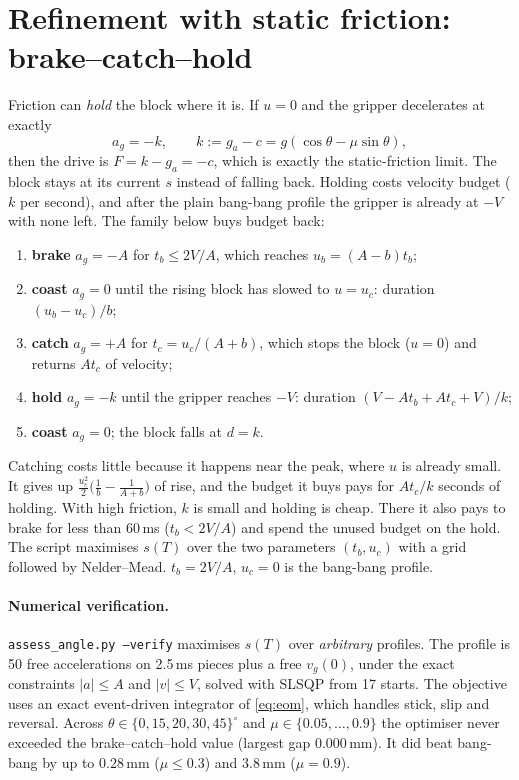 \documentclass[11pt,a4paper]{article}
\newcommand{\code}[1]{\texttt{#1}}
\begin{document}
\section{Refinement with static friction: brake--catch--hold}\label{sec:hold}
Friction can \emph{hold} the block where it is. If $u=0$ and the gripper decelerates at exactly
\[
  a_g=-k,\qquad k:=g_a-c=g(\cos\theta-\mu\sin\theta),
\]
then the drive is $F=k-g_a=-c$, which is exactly the static-friction limit. The block stays at its current $s$ instead of
falling back. Holding costs velocity budget ($k$ per second), and after the plain bang-bang profile the gripper is
already at $-V$ with none left. The family below buys budget back:
\begin{enumerate}
  \item \textbf{brake} $a_g=-A$ for $t_b\le 2V/A$, which reaches $u_b=(A-b)t_b$;
  \item \textbf{coast} $a_g=0$ until the rising block has slowed to $u=u_c$: duration $(u_b-u_c)/b$;
  \item \textbf{catch} $a_g=+A$ for $t_c=u_c/(A+b)$, which stops the block ($u=0$) and returns $At_c$ of velocity;
  \item \textbf{hold} $a_g=-k$ until the gripper reaches $-V$: duration $(V-At_b+At_c+V)/k$;
  \item \textbf{coast} $a_g=0$; the block falls at $d=k$.
\end{enumerate}
Catching costs little because it happens near the peak, where $u$ is already small. It gives up
$\tfrac{u_c^2}{2}\big(\tfrac1b-\tfrac1{A+b}\big)$ of rise, and the budget it buys pays for $At_c/k$ seconds of holding.
With high friction, $k$ is small and holding is cheap. There it also pays to brake for less than 60\,ms
($t_b<2V/A$) and spend the unused budget on the hold. The script maximises $s(T)$ over the two parameters
$(t_b,u_c)$ with a grid followed by Nelder--Mead. $t_b=2V/A$, $u_c=0$ is the bang-bang profile.

\paragraph{Numerical verification.} \code{assess\_angle.py --verify} maximises $s(T)$ over \emph{arbitrary}
profiles. The profile is 50 free accelerations on 2.5\,ms pieces plus a free $v_g(0)$, under the exact constraints
$|a|\le A$ and $|v|\le V$, solved with SLSQP from 17 starts. The objective uses an exact event-driven integrator of
\eqref{eq:eom}, which handles stick, slip and reversal. Across $\theta\in\{0,15,20,30,45\}^\circ$ and
$\mu\in\{0.05,\dots,0.9\}$ the optimiser never exceeded the brake--catch--hold value (largest gap $0.000$\,mm).
It did beat bang-bang by up to $0.28$\,mm ($\mu\le0.3$) and $3.8$\,mm ($\mu=0.9$).
\end{document}
